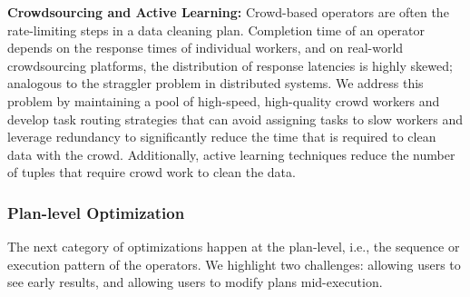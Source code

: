 
\vspace{.5em}
{\noindent \bf Crowdsourcing and Active Learning:} 
Crowd-based operators are often the rate-limiting steps in a data cleaning plan.
Completion time of an operator depends on the response times of individual workers, and on real-world crowdsourcing 
platforms, the distribution of response latencies is highly skewed; analogous to the straggler problem in distributed systems.
We address this problem by maintaining a pool of high-speed, high-quality crowd workers and develop task routing strategies 
that can avoid assigning tasks to slow workers and leverage redundancy to significantly reduce the time that is required to clean 
data with the crowd. Additionally, active learning techniques reduce the number of tuples that require crowd work to clean the
data.

\vspace{-0.25cm}
\subsubsection{Plan-level Optimization}
The next category of optimizations happen at the plan-level, i.e., the sequence or execution pattern of the operators.
We highlight two challenges: allowing users to see early results, and allowing users to modify plans mid-execution.


